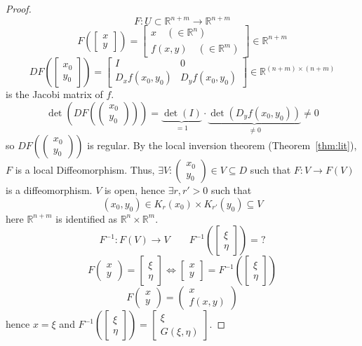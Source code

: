 \documentclass{article}
\newcommand{\vectwo}[2]{\begin{pmatrix} #1 \\ #2 \end{pmatrix}}
\begin{document}
\begin{proof}
  \label{proof:ift}
  \[ F: U \subset \mathbb R^{n + m} \to \mathbb R^{n + m} \]
  \[
    F\left(\begin{bmatrix} x \\ y \end{bmatrix}\right)
    = \begin{bmatrix} x \quad (\in \mathbb R^{n}) \\ f(x,y)  \quad (\in \mathbb R^m)\end{bmatrix} \in \mathbb R^{n + m}
  \] \[
    DF\left(\begin{bmatrix} x_0 \\ y_0 \end{bmatrix}\right) = \begin{bmatrix}
      I & 0 \\
      D_x f(x_0, y_0) & D_y f(x_0, y_0)
    \end{bmatrix}
    \in \mathbb R^{(n + m) \times (n + m)}
  \]
  is the Jacobi matrix of $f$.
  \[ \det\left(DF(\vectwo{x_0}{y_0})\right) = \underbrace{\det(I)}_{= 1} \cdot \underbrace{\det(D_yf(x_0, y_0))}_{\neq 0} \neq 0 \]
  so $DF(\vectwo{x_0}{y_0})$ is regular. By the local inversion theorem (Theorem~\ref{thm:lit}), $F$ is a local Diffeomorphism.
  Thus, $\exists V: \vectwo{x_0}{y_0} \in V \subseteq D$ such that $F: V \to F(V)$ is a diffeomorphism.
  $V$ is open, hence $\exists r, r' > 0$ such that
  \[ (x_0, y_0) \in K_r(x_0) \times K_{r'}(y_0) \subseteq V \]
  here $\mathbb R^{n + m}$ is identified as $\mathbb R^n \times \mathbb R^m$.
  \[ F^{-1}: F(V) \to V \qquad F^{-1}(\begin{bmatrix} \xi \\ \eta \end{bmatrix}) = \text{?} \]
  \[ F\vectwo xy = \begin{bmatrix} \xi \\ \eta \end{bmatrix} \iff \begin{bmatrix} x \\ y \end{bmatrix} = F^{-1}(\begin{bmatrix} \xi \\ \eta \end{bmatrix}) \]
  \[ F\vectwo xy = \vectwo{x}{f(x,y)} \]
  hence $x = \xi$ and $F^{-1}(\begin{bmatrix} \xi \\ \eta \end{bmatrix}) = \begin{bmatrix} \xi \\ G(\xi, \eta) \end{bmatrix}$.

\end{proof}
\end{document}
